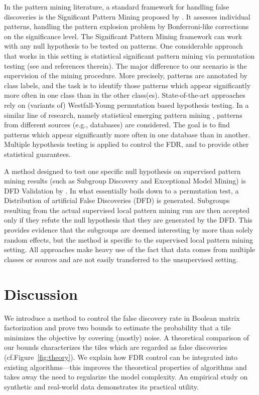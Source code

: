 In the pattern mining literature, a standard framework for handling false discoveries is the Significant Pattern Mining proposed by \cite{webb2007discovering}.  It assesses individual patterns, handling the pattern explosion problem by Bonferroni-like corrections on the significance level. The Significant Pattern Mining framework can work with any null hypothesis to be tested on patterns.  
One considerable approach that works in this setting is statistical significant pattern mining via permutation testing (see \citep{llinares2015fast} and references therein). The major difference to our scenario is the supervision of the mining procedure. More precisely, patterns are annotated by class labels, and the task is to identify those patterns which appear significantly more often in one class than in the other class(es). State-of-the-art approaches rely on (variants of) Westfall-Young permutation based hypothesis testing. 
In a similar line of research, namely statistical emerging pattern mining \citep{komiyama2017statistical}, patterns from different sources (e.g., databases) are considered. The goal is to find patterns which appear significantly more often in one database than in another. Multiple hypothesis testing is applied to control the FDR, and to provide other statistical guarantees. 

A method designed to test one specific null hypothesis on supervised pattern mining results (such as Subgroup Discovery and Exceptional Model Mining) is DFD Validation by \cite{duivesteijn2011exploiting}.  In what essentially boils down to a permutation test, a Distribution of artificial False Discoveries (DFD) is generated.  Subgroups resulting from the actual supervised local pattern mining run are then accepted only if they refute the null hypothesis that they are generated by the DFD.  This provides evidence that the subgroups are deemed interesting by more than solely random effects, but the method is specific to the supervised local pattern mining setting.
All approaches make heavy use of the fact that data comes from multiple classes or sources and are not easily transferred to the unsupervised setting. 
\section{Discussion}\label{sec:TP:discussion}
We introduce  a method to control the false discovery rate in Boolean matrix factorization and prove two bounds to estimate the probability that a tile minimizes the objective by covering (mostly) noise.
A theoretical comparison of our bounds characterizes the tiles which are regarded as false discoveries (cf.\@ Figure~\ref{fig:theory}). 
We explain how FDR control can be integrated into existing algorithms---this improves the theoretical properties of algorithms and takes away the need to regularize the model complexity. An empirical study on synthetic and real-world data demonstrates its practical utility.

